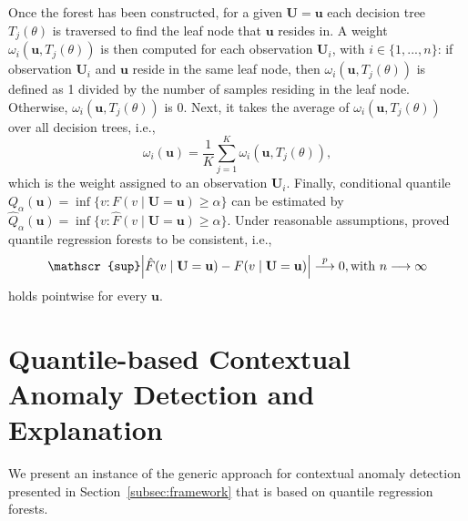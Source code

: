 \documentclass[pdflatex,sn-basic]{sn-jnl}%
\theoremstyle{thmstyleone}%
\theoremstyle{thmstyletwo}%
\theoremstyle{thmstylethree}%
\begin{document}
Once the forest has been constructed, for a given $\mathbf{U} = \mathbf{u}$ each decision tree $T_{j}(\theta)$ is traversed to find the leaf node that $\mathbf{u}$ resides in. A weight $\omega_{i}(\mathbf{u},T_{j}(\theta))$ is then computed 
for each observation $\mathbf{U}_{i}$, with $i \in \{1,...,n\}$: if observation $\mathbf{U}_{i}$ and $\mathbf{u}$ reside in the same leaf node, then $\omega_{i}(\mathbf{u},T_{j}(\theta))$ is defined as 1 divided by the number of samples residing in the leaf node. Otherwise,  $\omega_{i}(\mathbf{u},T_{j}(\theta))$ is $0$. Next, it takes the average of $\omega_{i}(\mathbf{u},T_{j}(\theta))$ over all decision trees, i.e.,
\begin{equation}
\omega_{i}(\mathbf{u}) = \frac{1}{K} \sum_{j=1}^{K}\omega_{i}(\mathbf{u},T_{j}(\theta)),
\label{eq2}
\end{equation}
which is the weight assigned to an observation $\mathbf{U}_{i}$. Finally, conditional quantile $Q_{\alpha}(\mathbf{u}) = \inf \{v: F(v \mid \mathbf{U}=\mathbf{u}) \geq \alpha\}$ can be estimated by $\hat{Q}_{\alpha}(\mathbf{u}) = \inf \{v: \hat{F}(v \mid \mathbf{U}=\mathbf{u}) \geq \alpha\}$. Under reasonable assumptions, \cite{meinshausen2006quantile} proved quantile regression forests to be consistent, i.e., 
\begin{equation}
\mathscr{sup}\abs{\hat{F}(v \mid \mathbf{U}=\mathbf{u}) - F(v \mid \mathbf{U}=\mathbf{u})} \stackrel{p}\longrightarrow 0, \textrm{with } n \longrightarrow \infty
\label{eq3}
\end{equation}
holds pointwise for every $\mathbf{u}$. 

\section{Quantile-based Contextual Anomaly Detection and Explanation}
\label{sec:qcad}

We present an instance of the generic approach for contextual anomaly detection presented in Section~\ref{subsec:framework} that is based on quantile regression forests. 
\end{document}
